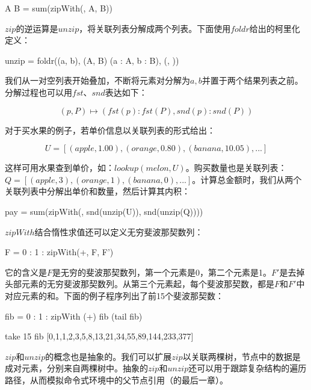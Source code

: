 \documentclass[b5paper]{ctexart}
\begin{document}
\be
A \cdot B = sum(zipWith(\cdot, A, B))
\ee

$zip$的逆运算是$unzip$，将关联列表分解成两个列表。下面使用$foldr$给出的柯里化定义：

\be
unzip = foldr((a, b), (A, B) \mapsto (a : A, b : B), (\nil, \nil))
\ee

我们从一对空列表开始叠加，不断将元素对分解为$a, b$并置于两个结果列表之前。分解过程也可以用$fst$、$snd$表达如下：

\[
(p, P) \mapsto (fst(p) : fst(P), snd(p) : snd(P))
\]

对于买水果的例子，若单价信息以关联列表的形式给出：

\[
U = [(apple, 1.00), (orange, 0.80), (banana, 10.05), ...]
\]

这样可用水果查到单价，如：$lookup(melon, U)$。购买数量也是关联列表：$Q = [(apple, 3), (orange, 1), (banana, 0), ...]$。计算总金额时，我们从两个关联列表中分解出单价和数量，然后计算其内积：

\be
pay = sum(zipWith(\cdot, snd(unzip(U)), snd(unzip(Q))))
\ee

$zipWith$结合惰性求值还可以定义无穷斐波那契数列：

\be
F = 0 : 1 : zipWith(+, F, F')
\ee

它的含义是$F$是无穷的斐波那契数列，第一个元素是0，第二个元素是1。$F'$是去掉头部元素的无穷斐波那契数列。从第三个元素起，每个斐波那契数，都是$F$和$F'$中对应元素的和。下面的例子程序列出了前15个斐波那契数：

\begin{Haskell}
fib = 0 : 1 : zipWith (+) fib (tail fib)

take 15 fib
[0,1,1,2,3,5,8,13,21,34,55,89,144,233,377]
\end{Haskell}

$zip$和$unzip$的概念也是抽象的。我们可以扩展$zip$以关联两棵树，节点中的数据是成对元素，分别来自两棵树中。抽象的$zip$和$unzip$还可以用于跟踪复杂结构的遍历路径，从而模拟命令式环境中的父节点引用（\cite{learn-haskell}的最后一章）。

\begin{Exercise}
\end{Exercise}
\end{document}
